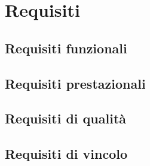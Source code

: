 \section{Requisiti }

\subsection{Requisiti funzionali }
\subsection{Requisiti prestazionali }
\subsection{Requisiti di qualità }
\subsection{Requisiti di vincolo }